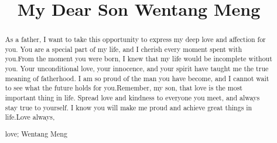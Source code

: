 \documentclass{mcmthesis}
\title{My Dear Son Wentang Meng}
\begin{document}
\begin{abstract}
As a father, I want to take this opportunity to express my deep love and affection for you. You are a special part of my life, and I cherish every moment spent with you.From the moment you were born, I knew that my life would be incomplete without you. Your unconditional love, your innocence, and your spirit have taught me the true meaning of fatherhood. I am so proud of the man you have become, and I cannot wait to see what the future holds for you.Remember, my son, that love is the most important thing in life. Spread love and kindness to everyone you meet, and always stay true to yourself. I know you will make me proud and achieve great things in life.Love always,

\begin{keywords}
love; Wentang Meng
\end{keywords}
\end{abstract}
\maketitle
 \tableofcontents
 \newpage


\end{document}
